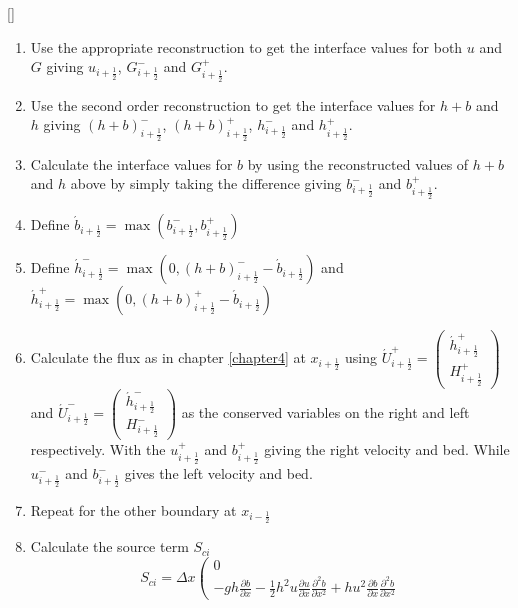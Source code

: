 []
\begin{alg}
	\label{MethodWellBalancedAudusse}
	\begin{enumerate}
		\item Use the appropriate reconstruction to get the interface values for both $u$ and $G$ giving $u_{i + \frac{1}{2}}$, $G^{-}_{i + \frac{1}{2}}$ and $G^{+}_{i + \frac{1}{2}}$.
		\item Use the second order reconstruction to get the interface values for $h+b$ and $h$ giving $(h+b)^{-}_{i + \frac{1}{2}}$, $(h+b)^{+}_{i + \frac{1}{2}}$, $h^{-}_{i + \frac{1}{2}}$ and $h^{+}_{i + \frac{1}{2}}$.
		\item Calculate the interface values for $b$ by using the reconstructed values of $h+b$ and $h$ above by simply taking the difference giving $b^{-}_{i + \frac{1}{2}}$ and $b^{+}_{i + \frac{1}{2}}$.
		\item Define $\acute{b}_{i + \frac{1}{2}} = \max\left(b^{-}_{i + \frac{1}{2}} , b^{+}_{i + \frac{1}{2}}\right)$
		\item Define $\acute{h}^{-}_{i + \frac{1}{2}} = \max\left(0 ,(h+b)^{-}_{i + \frac{1}{2}} - \acute{b}_{i + \frac{1}{2}} \right)$ and $\acute{h}^{+}_{i + \frac{1}{2}} = \max\left(0 ,(h+b)^{+}_{i + \frac{1}{2}} - \acute{b}_{i + \frac{1}{2}} \right)$
		\item Calculate the flux as in chapter \ref{chapter4} at $x_{i + \frac{1}{2}}$ using $\acute{U}^{+}_{i + \frac{1}{2}} = \left(\begin{array}{c}
		\acute{h}^{+}_{i + \frac{1}{2}} \\
		H^+_{i + \frac{1}{2}}
		\end{array}\right)$ and $\acute{U}^{-}_{i + \frac{1}{2}} = \left(\begin{array}{c}
		\acute{h}^{-}_{i + \frac{1}{2}} \\
		H^-_{i + \frac{1}{2}}
		\end{array}\right)$ as the conserved variables on the right and left respectively. With the $u^{+}_{i + \frac{1}{2}}$ and $b^{+}_{i + \frac{1}{2}}$ giving the right velocity and bed. While $u^{-}_{i + \frac{1}{2}}$ and $b^{-}_{i + \frac{1}{2}}$ gives the left velocity and bed.
		\item Repeat for the other boundary at $x_{i - \frac{1}{2}}$ 
		\item Calculate the source term $S_{ci}$ 
		\[S_{ci} = \Delta x \left(\begin{array}{c}
		0 \\
		-g h \frac{\partial b}{\partial x} - \frac{1}{2} h^2 {u} \frac{\partial {u}}{\partial x} \frac{\partial^2 b}{\partial x^2} + h {u}^2 \frac{\partial b}{\partial x} \frac{\partial^2 b}{\partial x^2}

\end{array}\]
\end{enumerate}
\end{alg}
